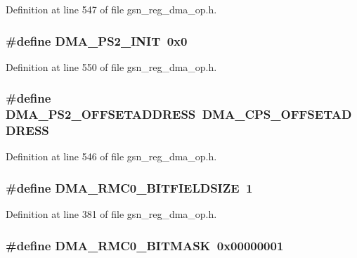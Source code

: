 Definition at line 547 of file gsn\_\-reg\_\-dma\_\-op.h.

\hypertarget{a00547_a4c993ea5e44be4f0180b682a95aa8e2b}{
\subsubsection[{DMA\_\-PS2\_\-INIT}]{\setlength{\rightskip}{0pt plus 5cm}\#define DMA\_\-PS2\_\-INIT~0x0}}
\label{a00547_a4c993ea5e44be4f0180b682a95aa8e2b}


Definition at line 550 of file gsn\_\-reg\_\-dma\_\-op.h.

\hypertarget{a00547_a4974d5a13dd6c22f59c9ff0ffc881f89}{
\subsubsection[{DMA\_\-PS2\_\-OFFSETADDRESS}]{\setlength{\rightskip}{0pt plus 5cm}\#define DMA\_\-PS2\_\-OFFSETADDRESS~DMA\_\-CPS\_\-OFFSETADDRESS}}
\label{a00547_a4974d5a13dd6c22f59c9ff0ffc881f89}


Definition at line 546 of file gsn\_\-reg\_\-dma\_\-op.h.

\hypertarget{a00547_a14a52b9dc893b21683e2758a670e0951}{
\subsubsection[{DMA\_\-RMC0\_\-BITFIELDSIZE}]{\setlength{\rightskip}{0pt plus 5cm}\#define DMA\_\-RMC0\_\-BITFIELDSIZE~1}}
\label{a00547_a14a52b9dc893b21683e2758a670e0951}


Definition at line 381 of file gsn\_\-reg\_\-dma\_\-op.h.

\hypertarget{a00547_adc5576d54a689000d389aeb7fd2910a1}{
\subsubsection[{DMA\_\-RMC0\_\-BITMASK}]{\setlength{\rightskip}{0pt plus 5cm}\#define DMA\_\-RMC0\_\-BITMASK~0x00000001}}
\label{a00547_adc5576d54a689000d389aeb7fd2910a1}


